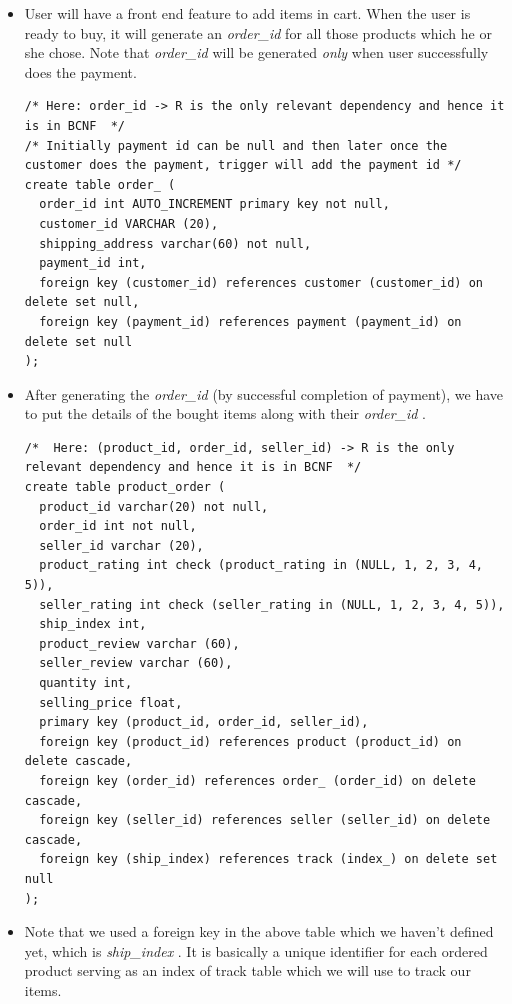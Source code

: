 \documentclass[a4paper,12pt]{article}
\newcommand{\ita}[1]{
    \textit{#1}
}
\begin{document}
\begin{itemize}
\begin{verbatim}
  \end{verbatim}
  \item User will have a front end feature to add items in cart. When the user is ready to buy, it will generate an \ita{order\_id} for all those products which he or she chose. Note that \ita{order\_id} will be generated \ita{only} when user successfully does the payment.
  \begin{verbatim}
/* Here: order_id -> R is the only relevant dependency and hence it is in BCNF  */
/* Initially payment id can be null and then later once the customer does the payment, trigger will add the payment id */
create table order_ (
  order_id int AUTO_INCREMENT primary key not null,
  customer_id VARCHAR (20),
  shipping_address varchar(60) not null,
  payment_id int,
  foreign key (customer_id) references customer (customer_id) on delete set null,
  foreign key (payment_id) references payment (payment_id) on delete set null
);
  \end{verbatim}
  \item After generating the \ita{order\_id} (by successful completion of payment), we have to put the details of the bought items along with their \ita{order\_id}.
  \begin{verbatim}
/*  Here: (product_id, order_id, seller_id) -> R is the only relevant dependency and hence it is in BCNF  */
create table product_order (
  product_id varchar(20) not null,
  order_id int not null,
  seller_id varchar (20),
  product_rating int check (product_rating in (NULL, 1, 2, 3, 4, 5)),
  seller_rating int check (seller_rating in (NULL, 1, 2, 3, 4, 5)),
  ship_index int,
  product_review varchar (60),
  seller_review varchar (60),
  quantity int,
  selling_price float,
  primary key (product_id, order_id, seller_id),
  foreign key (product_id) references product (product_id) on delete cascade,
  foreign key (order_id) references order_ (order_id) on delete cascade,
  foreign key (seller_id) references seller (seller_id) on delete cascade,
  foreign key (ship_index) references track (index_) on delete set null
);
  \end{verbatim}
  \item Note that we used a foreign key in the above table which we haven't defined yet, which is \ita{ship\_index}. It is basically a unique identifier for each ordered product serving as an index of track table which we will use to track our items.
  \begin{verbatim}
    

\end{verbatim}
\end{itemize}
\end{document}
